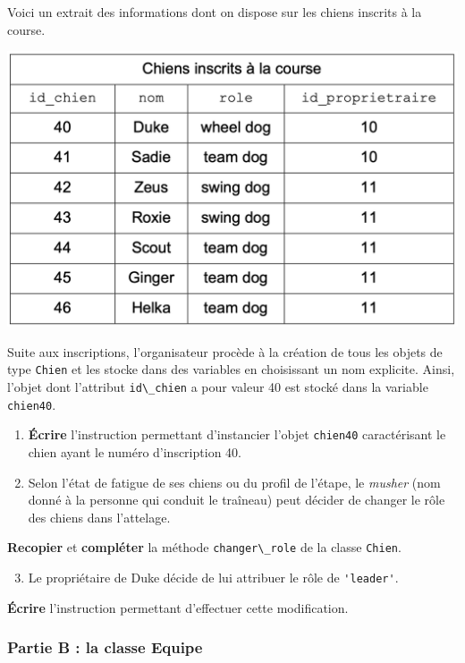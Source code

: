 Voici un extrait des informations dont on dispose sur les chiens
inscrits à la course.

\includegraphics{24-NSIJ1ME1-Ex3-01.png}

Suite aux inscriptions, l'organisateur procède à la création de tous les
objets de type \passthrough{\lstinline!Chien!} et les stocke dans des
variables en choisissant un nom explicite. Ainsi, l'objet dont
l'attribut \passthrough{\lstinline!id\_chien!} a pour valeur 40 est
stocké dans la variable \passthrough{\lstinline!chien40!}.

\begin{enumerate}
\item
  \textbf{Écrire} l'instruction permettant d'instancier l'objet
  \passthrough{\lstinline!chien40!} caractérisant le chien ayant le
  numéro d'inscription 40.
\item
  Selon l'état de fatigue de ses chiens ou du profil de l'étape, le
  \emph{musher} (nom donné à la personne qui conduit le traîneau) peut
  décider de changer le rôle des chiens dans l'attelage.
\end{enumerate}

\textbf{Recopier} et \textbf{compléter} la méthode
\passthrough{\lstinline!changer\_role!} de la classe
\passthrough{\lstinline!Chien!}.

\begin{enumerate}
\setcounter{enumi}{2}
\item
  Le propriétaire de Duke décide de lui attribuer le rôle de
  \passthrough{\lstinline!'leader'!}.
\end{enumerate}

\textbf{Écrire} l'instruction permettant d'effectuer cette modification.

\subsubsection{Partie B : la classe
Equipe}\label{partie-b-la-classe-equipe}

